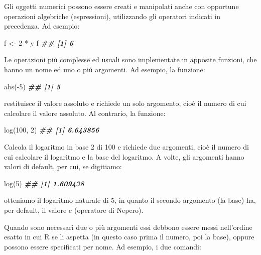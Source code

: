 \documentclass[
  12pt,
]{book}
\newenvironment{Shaded}{\begin{snugshade}}{\end{snugshade}}
\newcommand{\DecValTok}[1]{\textcolor[rgb]{0.00,0.00,0.81}{#1}}
\newcommand{\DocumentationTok}[1]{\textcolor[rgb]{0.56,0.35,0.01}{\textbf{\textit{#1}}}}
\newcommand{\FunctionTok}[1]{\textcolor[rgb]{0.00,0.00,0.00}{#1}}
\newcommand{\NormalTok}[1]{#1}
\newcommand{\OtherTok}[1]{\textcolor[rgb]{0.56,0.35,0.01}{#1}}
\newcommand{\SpecialCharTok}[1]{\textcolor[rgb]{0.00,0.00,0.00}{#1}}
\begin{document}
Gli oggetti numerici possono essere creati e manipolati anche con opportune operazioni algebriche (espressioni), utilizzando gli operatori indicati in precedenza. Ad esempio:

\begin{Shaded}
\begin{Highlighting}[]
\NormalTok{f  }\OtherTok{\textless{}{-}}  \DecValTok{2} \SpecialCharTok{*}\NormalTok{ y}
\NormalTok{f}
\DocumentationTok{\#\# [1] 6}
\end{Highlighting}
\end{Shaded}

Le operazioni più complesse ed usuali sono implementate in apposite funzioni, che hanno un nome ed uno o più argomenti. Ad esempio, la funzione:

\begin{Shaded}
\begin{Highlighting}[]
\FunctionTok{abs}\NormalTok{(}\SpecialCharTok{{-}}\DecValTok{5}\NormalTok{)}
\DocumentationTok{\#\# [1] 5}
\end{Highlighting}
\end{Shaded}

restituisce il valore assoluto e richiede un solo argomento, cioè il numero di cui calcolare il valore assoluto. Al contrario, la funzione:

\begin{Shaded}
\begin{Highlighting}[]
\FunctionTok{log}\NormalTok{(}\DecValTok{100}\NormalTok{, }\DecValTok{2}\NormalTok{)}
\DocumentationTok{\#\# [1] 6.643856}
\end{Highlighting}
\end{Shaded}

Calcola il logaritmo in base 2 di 100 e richiede due argomenti, cioè il numero di cui calcolare il logaritmo e la base del logaritmo. A volte, gli argomenti hanno valori di default, per cui, se digitiamo:

\begin{Shaded}
\begin{Highlighting}[]
\FunctionTok{log}\NormalTok{(}\DecValTok{5}\NormalTok{)}
\DocumentationTok{\#\# [1] 1.609438}
\end{Highlighting}
\end{Shaded}

otteniamo il logaritmo naturale di 5, in quanto il secondo argomento (la base) ha, per default, il valore \(e\) (operatore di Nepero).

Quando sono necessari due o più argomenti essi debbono essere messi nell'ordine esatto in cui R se li aspetta (in questo caso prima il numero, poi la base), oppure possono essere specificati per nome. Ad esempio, i due comandi:
\end{document}
